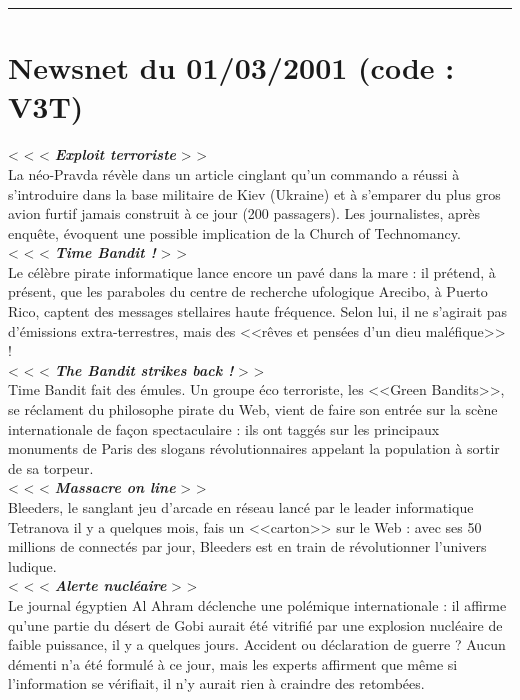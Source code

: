 \documentclass[11pt,twoside,a4paper]{book}
\begin{document}
\hrule

\clearpage

\section*{Newsnet du 01/03/2001 (code : V3T)}

< < <  \textbf{\textit{Exploit terroriste}} > >~\\
La n{\'e}o-Pravda r{\'e}v{\`e}le dans un article cinglant qu'un commando a r{\'e}ussi {\`a} s'introduire dans la base militaire de Kiev (Ukraine) et {\`a} s'emparer du plus gros avion furtif jamais construit {\`a} ce jour (200 passagers). Les journalistes, apr{\`e}s enqu{\^e}te, {\'e}voquent une possible implication de la Church of Technomancy.~\\
< < <  \textbf{\textit{Time Bandit !}} > >~\\
Le c{\'e}l{\`e}bre pirate informatique lance encore un pav{\'e} dans la mare : il pr{\'e}tend, {\`a} pr{\'e}sent, que les paraboles du centre de recherche ufologique Arecibo, {\`a} Puerto Rico, captent des messages stellaires haute fr{\'e}quence. Selon lui, il ne s'agirait pas d'{\'e}missions extra-terrestres, mais des <<r{\^e}ves et pens{\'e}es d'un dieu mal{\'e}fique>> !~\\
< < <  \textbf{\textit{The Bandit strikes back !}} > >~\\
Time Bandit fait des {\'e}mules. Un groupe {\'e}co terroriste, les <<Green Bandits>>, se r{\'e}clament du philosophe pirate du Web, vient de faire son entr{\'e}e sur la sc{\`e}ne internationale de fa\c{c}on spectaculaire : ils ont tagg{\'e}s sur les principaux monuments de Paris des slogans r{\'e}volutionnaires appelant la population {\`a} sortir de sa torpeur.~\\
< < <  \textbf{\textit{Massacre on line}} > >~\\
Bleeders, le sanglant jeu d'arcade en r{\'e}seau lanc{\'e} par le leader informatique Tetranova il y a quelques mois, fais un <<carton>> sur le Web : avec ses 50 millions de connect{\'e}s par jour, Bleeders est en train de r{\'e}volutionner l'univers ludique.~\\
< < <  \textbf{\textit{Alerte nucl{\'e}aire}} > >~\\
Le journal {\'e}gyptien Al Ahram d{\'e}clenche une pol{\'e}mique internationale : il affirme qu'une partie du d{\'e}sert de Gobi aurait {\'e}t{\'e} vitrifi{\'e} par une explosion nucl{\'e}aire de faible puissance, il y a quelques jours. Accident ou d{\'e}claration de guerre ? Aucun d{\'e}menti n'a {\'e}t{\'e} formul{\'e} {\`a} ce jour, mais les experts affirment que m{\^e}me si l'information se v{\'e}rifiait, il n'y aurait rien {\`a} craindre des retomb{\'e}es.~\\
\end{document}
